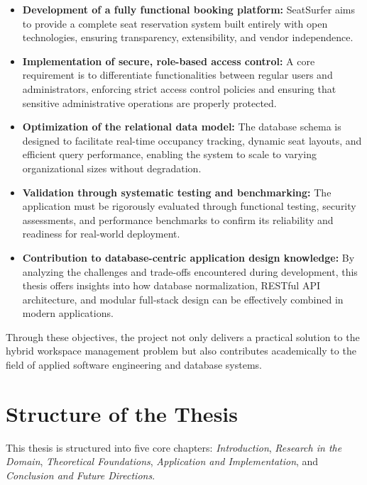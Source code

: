 \documentclass[12pt,a4paper]{report} %
\begin{document}
\begin{itemize}
    \item \textbf{Development of a fully functional booking platform:} SeatSurfer aims to provide a complete seat reservation system built entirely with open technologies, ensuring transparency, extensibility, and vendor independence.
    
    \item \textbf{Implementation of secure, role-based access control:} A core requirement is to differentiate functionalities between regular users and administrators, enforcing strict access control policies and ensuring that sensitive administrative operations are properly protected.
    
    \item \textbf{Optimization of the relational data model:} The database schema is designed to facilitate real-time occupancy tracking, dynamic seat layouts, and efficient query performance, enabling the system to scale to varying organizational sizes without degradation.
    
    \item \textbf{Validation through systematic testing and benchmarking:} The application must be rigorously evaluated through functional testing, security assessments, and performance benchmarks to confirm its reliability and readiness for real-world deployment.
    
    \item \textbf{Contribution to database-centric application design knowledge:} By analyzing the challenges and trade-offs encountered during development, this thesis offers insights into how database normalization, RESTful API architecture, and modular full-stack design can be effectively combined in modern applications.
\end{itemize}

Through these objectives, the project not only delivers a practical solution to the hybrid workspace management problem but also contributes academically to the field of applied software engineering and database systems.

\section*{Structure of the Thesis}

This thesis is structured into five core chapters: \textit{Introduction}, \textit{Research in the Domain}, \textit{Theoretical Foundations}, \textit{Application and Implementation}, and \textit{Conclusion and Future Directions}.
\end{document}
